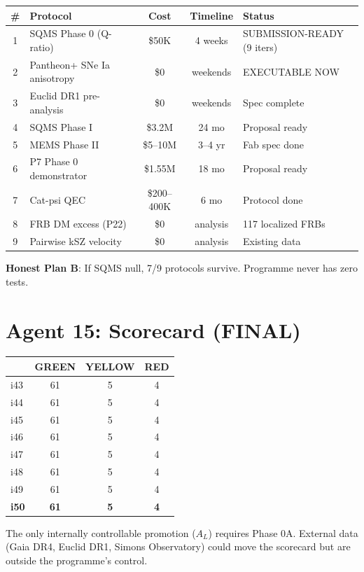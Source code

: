 \documentclass[11pt,a4paper]{article}
\newcommand{\GREEN}{\textcolor{dfdgreen}{\textbf{GREEN}}}
\newcommand{\YELLOW}{\textcolor{dfdyellow}{\textbf{YELLOW}}}
\newcommand{\RED}{\textcolor{dfdred}{\textbf{RED}}}
\begin{document}
\begin{center}
\begin{longtable}{clccl}
\toprule
\textbf{\#} & \textbf{Protocol} & \textbf{Cost} & \textbf{Timeline} & \textbf{Status} \\
\midrule
\endfirsthead
1 & SQMS Phase 0 (Q-ratio) & \$50K & 4 weeks & SUBMISSION-READY (9 iters) \\
2 & Pantheon+ SNe Ia anisotropy & \$0 & weekends & EXECUTABLE NOW \\
3 & Euclid DR1 pre-analysis & \$0 & weekends & Spec complete \\
4 & SQMS Phase I & \$3.2M & 24 mo & Proposal ready \\
5 & MEMS Phase II & \$5--10M & 3--4 yr & Fab spec done \\
6 & P7 Phase 0 demonstrator & \$1.55M & 18 mo & Proposal ready \\
7 & Cat-psi QEC & \$200--400K & 6 mo & Protocol done \\
8 & FRB DM excess (P22) & \$0 & analysis & 117 localized FRBs \\
9 & Pairwise kSZ velocity & \$0 & analysis & Existing data \\
\bottomrule
\end{longtable}
\end{center}

\textbf{Honest Plan B}: If SQMS null, 7/9 protocols survive. Programme never has zero tests.


\part{Agent 15: Scorecard (FINAL)}
\label{part:agent15}

\begin{tcolorbox}[colback=green!5!white, colframe=green!60!black,
  title={Scorecard: EIGHTH Consecutive Iteration at 61/5/4}]

\begin{center}
\begin{tabular}{lccc}
\toprule
& \textbf{\GREEN} & \textbf{\YELLOW} & \textbf{\RED} \\
\midrule
i43 & 61 & 5 & 4 \\
i44 & 61 & 5 & 4 \\
i45 & 61 & 5 & 4 \\
i46 & 61 & 5 & 4 \\
i47 & 61 & 5 & 4 \\
i48 & 61 & 5 & 4 \\
i49 & 61 & 5 & 4 \\
\textbf{i50} & \textbf{61} & \textbf{5} & \textbf{4} \\
\bottomrule
\end{tabular}
\end{center}

The only internally controllable promotion ($A_L$) requires Phase 0A. External data (Gaia DR4, Euclid DR1, Simons Observatory) could move the scorecard but are outside the programme's control.
\end{tcolorbox}
\end{document}
